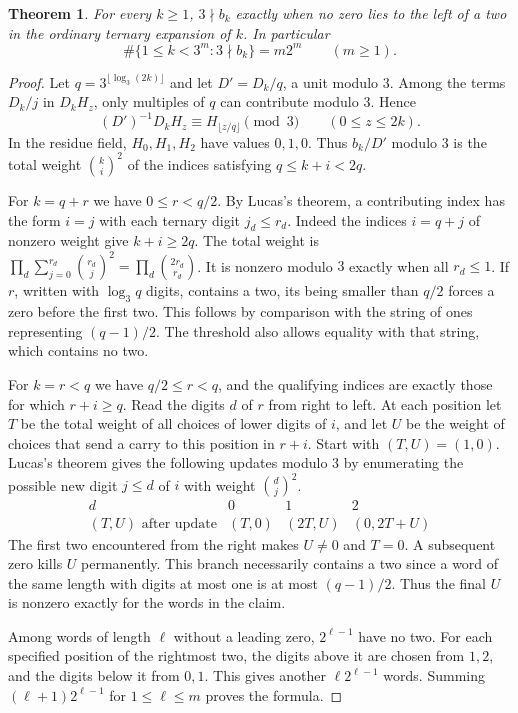 \documentclass[11pt,a4paper]{article}
\newtheorem{theorem}{Theorem}[section]
\theoremstyle{definition}\newtheorem{definition}[theorem]{Definition}\newtheorem{example}[theorem]{Example}
\theoremstyle{remark}\newtheorem{remark}[theorem]{Remark}
\begin{document}
\begin{theorem}
For every $k\ge1$, $3\nmid b_k$ exactly when no zero lies to the left
of a two in the ordinary ternary expansion of $k$. In particular
\[
 \#\{1\le k<3^m:3\nmid b_k\}=m2^m \qquad (m\ge1).
\]
\end{theorem}
\begin{proof}
Let $q=3^{\lfloor\log_3(2k)\rfloor}$ and let $D'=D_k/q$, a unit
modulo $3$. Among the terms $D_k/j$ in $D_kH_z$, only multiples of
$q$ can contribute modulo $3$. Hence
\[
 (D')^{-1}D_kH_z\equiv H_{\lfloor z/q\rfloor}\pmod3
 \qquad(0\le z\le2k).
\]
In the residue field, $H_0,H_1,H_2$ have values $0,1,0$. Thus
$b_k/D'$ modulo $3$ is the total weight $\binom{k}{i}^2$ of the
indices satisfying $q\le k+i<2q$.

For $k=q+r$ we have $0\le r<q/2$. By Lucas's theorem, a contributing
index has the form $i=j$ with each ternary digit $j_d\le r_d$.
Indeed the indices $i=q+j$ of nonzero weight give $k+i\ge2q$.
The total weight is
$\prod_d\sum_{j=0}^{r_d}\binom{r_d}{j}^2
=\prod_d\binom{2r_d}{r_d}$.
It is nonzero modulo $3$ exactly when all $r_d\le1$. If $r$,
written with $\log_3 q$ digits, contains a two, its being smaller than
$q/2$ forces a zero before the first two. This follows by comparison
with the string of ones representing $(q-1)/2$. The threshold also
allows equality with that string, which contains no two.

For $k=r<q$ we have $q/2\le r<q$, and the qualifying indices are
exactly those for which $r+i\ge q$. Read the digits $d$ of $r$ from
right to left. At each position let $T$ be the total weight of all
choices of lower digits of $i$, and let $U$ be the weight of choices
that send a carry to this position in $r+i$. Start with $(T,U)=(1,0)$.
Lucas's theorem gives the following updates modulo $3$ by enumerating
the possible new digit $j\le d$ of $i$ with weight $\binom{d}{j}^2$.
\[
\begin{array}{c|ccc}
 d&0&1&2\\ \hline
 (T,U)\text{ after update}
 &(T,0)&(2T,U)&(0,2T+U)
\end{array}
\]
The first two encountered from the right makes $U\ne0$ and $T=0$.
A subsequent zero kills $U$ permanently. This branch necessarily
contains a two since a word of the same length with digits at most
one is at most $(q-1)/2$. Thus the final $U$ is nonzero exactly for
the words in the claim.

Among words of length $\ell$ without a leading zero, $2^{\ell-1}$
have no two. For each specified position of the rightmost two, the
digits above it are chosen from $1,2$, and the digits below it from
$0,1$. This gives another $\ell2^{\ell-1}$ words. Summing
$(\ell+1)2^{\ell-1}$ for $1\le\ell\le m$ proves the formula.
\end{proof}
\end{document}
